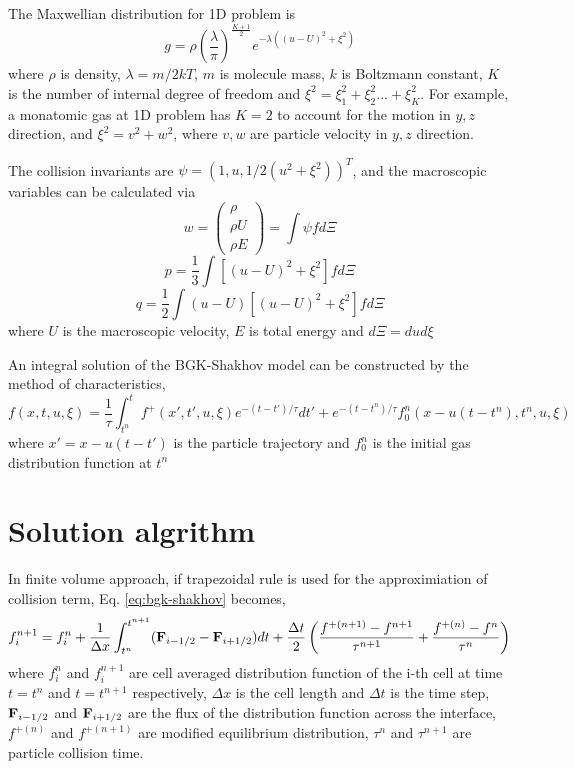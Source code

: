 \documentclass[a4paper]{book}
\begin{document}
The Maxwellian distribution for 1D problem is
\begin{equation}
    g = \rho\left(\frac{\lambda}{\pi}\right)^{\frac{K+1}{2}}e^{-\lambda((u-U)^2+\xi^2)}
\end{equation}
where $\rho$ is density, $\lambda=m/2kT$, $m$ is molecule mass, $k$ is Boltzmann constant, $K$ is the number of internal degree of freedom and $\xi^2=\xi_1^2+\xi_2^2...+\xi_K^2$. For example, a monatomic gas at 1D problem has $K=2$ to account for the motion in $y,z$ direction, and $\xi^2=v^2+w^2$, where $v,w$ are particle velocity in $y,z$ direction.

The collision invariants are $\psi=(1,u,1/2(u^2+\xi^2))^T$, and the macroscopic variables can be calculated via
\begin{equation}
w=\begin{pmatrix} \rho\\ \rho U\\ \rho E \end{pmatrix} = \int \psi fd\Xi
\end{equation}
\begin{equation}
    p=\frac{1}{3}\int [(u-U)^2+\xi^2]fd\Xi
\end{equation}
\begin{equation}
    q=\frac{1}{2}\int (u-U)[(u-U)^2+\xi^2]fd\Xi
\end{equation}
where $U$ is the macroscopic velocity, $E$ is total energy and $d\Xi=dud\xi$

An integral solution of the BGK-Shakhov model can be constructed by the method of characteristics\cite{Prendergast1993},
\begin{equation}
    \label{eq:csolution}
    f(x,t,u,\xi)=\frac{1}{\tau}\int_{t^n}^t f^+(x',t',u,\xi)e^{-(t-t')/\tau}dt'+e^{-(t-t^n)/\tau}f_0^n(x-u(t-t^n),t^n,u,\xi)
\end{equation}
where $x'=x-u(t-t')$ is the particle trajectory and $f_0^n$ is the initial gas distribution function at $t^n$

\section{Solution algrithm}
In finite volume approach, if trapezoidal rule is used for the approximiation of collision term, Eq. \ref{eq:bgk-shakhov} becomes,
\begin{equation} 
    \label{eq:bgk-shakhov_discrete}
    f_i^{n+1} = f_i^n+\frac{1}{\Delta x}\int_{t^n}^{t^{n+1}}({\bf F}_{i-1/2}-{\bf F}_{i+1/2})dt+\frac{\Delta t}{2}\left(\frac{f^{+(n+1)}-f^{n+1}}{\tau^{n+1}}+\frac{f^{+(n)}-f^n}{\tau^n}\right)
\end{equation}
where $f_i^n$ and $f_i^{n+1}$ are cell averaged distribution function of the i-th cell at time $t=t^n$ and $t=t^{n+1}$ respectively, $\Delta x$ is the cell length and $\Delta t$ is the time step, ${\bf F}_{i-1/2}$ and ${\bf F}_{i+1/2}$ are the flux of the distribution function across the interface, $f^{+(n)}$ and $f^{+(n+1)}$ are modified equilibrium distribution, $\tau^n$ and $\tau^{n+1}$ are particle collision time.
\end{document}
